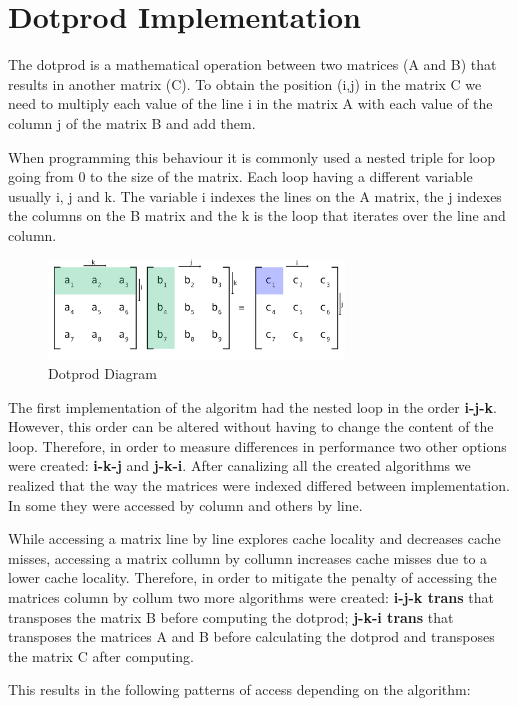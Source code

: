 \documentclass[a4paper]{report}
\begin{document}
\chapter{Dotprod Implementation}
The dotprod is a mathematical operation between two matrices (A and B) that
results in another matrix (C). To obtain the position (i,j) in the matrix C we
need to multiply each value of the line i in the matrix A with each value of the
column j of the matrix B and add them.

When programming this behaviour it is commonly used a nested triple for loop
going from 0 to the size of the matrix. Each loop having a different variable
usually i, j and k. The variable i indexes the lines on the A matrix, the j
indexes the columns on the B matrix and the k is the loop that iterates over the
line and column.

\begin{figure}[H]
    \centering
        \includegraphics[width=0.7\textwidth]{images/matrix_mult.png}
        \caption{Dotprod Diagram}
\end{figure}

The first implementation of the algoritm had the nested loop in the order
\textbf{i-j-k}. However, this order can be altered without having to change the
content of the loop. Therefore, in order to measure differences in performance
two other options were created: \textbf{i-k-j} and \textbf{j-k-i}. After
canalizing all the created algorithms we realized that the way the matrices were
indexed differed between implementation. In some they were accessed by column
and others by line.

While accessing a matrix line by line explores cache locality and decreases
cache misses, accessing a matrix collumn by collumn increases cache misses due
to a lower cache locality. Therefore, in order to mitigate the penalty of
accessing the matrices column by collum two more algorithms were created:
\textbf{i-j-k trans} that transposes the matrix B before computing the
dotprod; \textbf{j-k-i trans} that transposes the matrices A and B before
calculating the dotprod and transposes the matrix C after computing.

This results in the following patterns of access depending on the algorithm:
\end{document}
